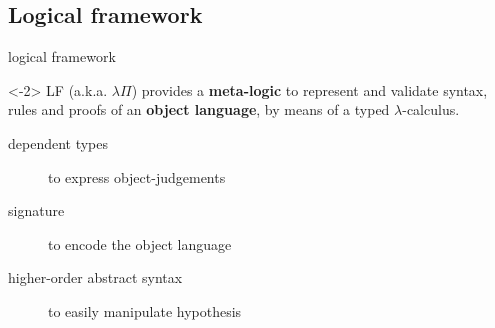 \documentclass[ignorenonframetext,red]{beamer}
\begin{document}
\subsection{Logical framework}

\begin{frame}{ logical framework }
  \begin{onlyenv}<-2>
    LF  (a.k.a. $\lambda\Pi$) provides a {\bf
      meta-logic} to represent and validate syntax, rules and proofs
    of an \textbf{object language}, by means of a typed
    $\lambda$-calculus.

    \begin{description}
    \item[dependent types] to express object-judgements
    \item[signature] to encode the object language
    \item[higher-order abstract syntax] to easily manipulate hypothesis
    \end{description}
    \pause
    \begin{examples}
\end{examples}
\end{onlyenv}
\end{frame}
\end{document}
